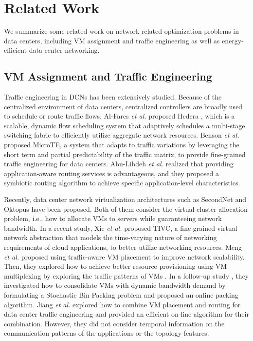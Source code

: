 \documentclass[journal,single-space,two column,twoside,10pt]{IEEEtran}
\begin{document}
\section{Related Work}
\label{sec:related}

We summarize some related work on network-related optimization problems in data centers, including VM assignment and traffic engineering as well as energy-efficient data center networking.


\subsection{VM Assignment and Traffic Engineering}

Traffic engineering in DCNs has been extensively studied. Because of the centralized environment of data centers, centralized controllers are broadly used to schedule or route traffic flows. Al-Fares \emph{et al.} proposed Hedera \cite{AL-Fares_Radhakrishnan-2010}, which is a scalable, dynamic flow scheduling system that adaptively schedules a multi-stage switching fabric to efficiently utilize aggregate network resources. Benson \emph{et al.} \cite{Benson_Anand-2011} proposed MicroTE, a system that adapts to traffic variations by leveraging the short term and partial predictability of the traffic matrix, to provide fine-grained traffic engineering for data centers. Abu-Libdeh \emph{et al.} \cite{Abu-Libdeh_Costa-2010} realized that providing application-aware routing services is advantageous, and they proposed a symbiotic routing algorithm to achieve specific application-level characteristics.

Recently, data center network virtualization architectures such as SecondNet \cite{Guo_Lu-2010} and Oktopus \cite{Ballani_Costa-2011} have been proposed. Both of them consider the virtual cluster allocation problem, i.e., how to allocate VMs to servers while guaranteeing network bandwidth. In a recent study, Xie \emph{et al.} \cite{Xie_Ding-2012} proposed TIVC, a fine-grained virtual network abstraction that models the time-varying nature of networking requirements of cloud applications, to better utilize networking resources. Meng \emph{et al.} \cite{Meng_Pappas-2010} proposed using traffic-aware VM placement to improve network scalability. Then, they explored how to achieve better resource provisioning using VM multiplexing by exploring the traffic patterns of VMs \cite{Meng_Isci-2010}. In a follow-up study \cite{Wang_Meng-2011}, they investigated how to consolidate VMs with dynamic bandwidth demand by formulating a Stochastic Bin Packing problem and proposed an online packing algorithm. Jiang \emph{et al.} \cite{Jiang_Lan-2012} explored how to combine VM placement and routing for data center traffic engineering and provided an efficient on-line algorithm for their combination. However, they did not consider temporal information on the communication patterns of the applications or the topology features.
\end{document}
